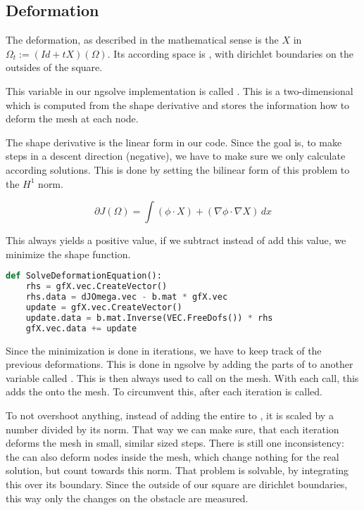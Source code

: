 \subsection{Deformation}
The deformation, as described in the mathematical sense is the $X$ in $\Omega_t := (Id + tX )(\Omega)$.
Its according space is , with dirichlet boundaries on the outsides of the square.

This variable in our ngsolve implementation is called . This is a two-dimensional  which is computed from the shape derivative and stores the information how to deform the mesh at each node.

The shape derivative is the linear form  in our code. Since the goal is, to make steps in a descent direction (negative), we have to make sure we only calculate according solutions.
This is done by setting the bilinear form of this problem to the $H^1$ norm.

\begin{equation}
	\partial J(\Omega) = \int(\phi\cdot X)+(\nabla\phi\cdot \nabla X) \, dx
\end{equation}

This always yields a positive value, if we subtract instead of add this value, we minimize the shape function.

\begin{lstlisting}[language=Python, title=Solving For The Deformation, label=lst:deformation_solve]
def SolveDeformationEquation():
	rhs = gfX.vec.CreateVector()
	rhs.data = dJOmega.vec - b.mat * gfX.vec
	update = gfX.vec.CreateVector()
	update.data = b.mat.Inverse(VEC.FreeDofs()) * rhs
	gfX.vec.data += update
\end{lstlisting}

Since the minimization is done in iterations, we have to keep track of the previous deformations. This is done in ngsolve by adding the parts of  to another variable called . This  is then always used to call  on the mesh.
With each call, this adds the  onto the mesh. To circumvent this, after each iteration  is called.

To not overshoot anything, instead of adding the entire  to , it is scaled by a number divided by its norm. That way we can make sure, that each iteration deforms the mesh in small, similar sized steps.
There is still one inconsistency: the  can also deform nodes inside the mesh, which change nothing for the real solution, but count towards this norm. That problem is solvable, by integrating this  over its boundary. Since the outside of our square are dirichlet boundaries, this way only the changes on the obstacle are measured.





